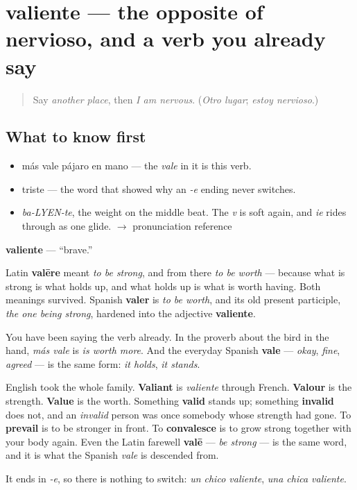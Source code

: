 \section[valiente]{valiente — the opposite of nervioso, and a verb you already say}

\label{lesson:ES-C326-valiente}



\begin{quote}
Say \emph{another place}, then \emph{I am nervous}. (\emph{Otro lugar}; \emph{estoy nervioso}.)
\end{quote}

\subsection*{What to know first}
\begin{itemize}
\raggedright
  \item más vale pájaro en mano — the \emph{vale} in it is this verb.
  \item triste — the word that showed why an \emph{-e} ending never switches.
\end{itemize}

\begin{sounds}
\begin{itemize}
\raggedright
  \item \emph{ba-LYEN-te}, the weight on the middle beat. The \emph{v} is soft again, and \emph{ie} rides through as one glide. $\to$ pronunciation reference
\end{itemize}
\end{sounds}

\begin{cousinweb}
\textbf{valiente} — \textquotedblleft{}brave.\textquotedblright{}

Latin \textbf{valēre} meant \emph{to be strong}, and from there \emph{to be worth} — because what is strong is what holds up, and what holds up is what is worth having. Both meanings survived. Spanish \textbf{valer} is \emph{to be worth}, and its old present participle, \emph{the one being strong}, hardened into the adjective \textbf{valiente}.

You have been saying the verb already. In the proverb about the bird in the hand, \emph{más vale} is \emph{is worth more}. And the everyday Spanish \textbf{vale} — \emph{okay}, \emph{fine}, \emph{agreed} — is the same form: \emph{it holds}, \emph{it stands}.

English took the whole family. \textbf{Valiant} is \emph{valiente} through French. \textbf{Valour} is the strength. \textbf{Value} is the worth. Something \textbf{valid} stands up; something \textbf{invalid} does not, and an \emph{invalid} person was once somebody whose strength had gone. To \textbf{prevail} is to be stronger in front. To \textbf{convalesce} is to grow strong together with your body again. Even the Latin farewell \textbf{valē} — \emph{be strong} — is the same word, and it is what the Spanish \emph{vale} is descended from.

It ends in \emph{-e}, so there is nothing to switch: \emph{un chico valiente}, \emph{una chica valiente}.
\end{cousinweb}

